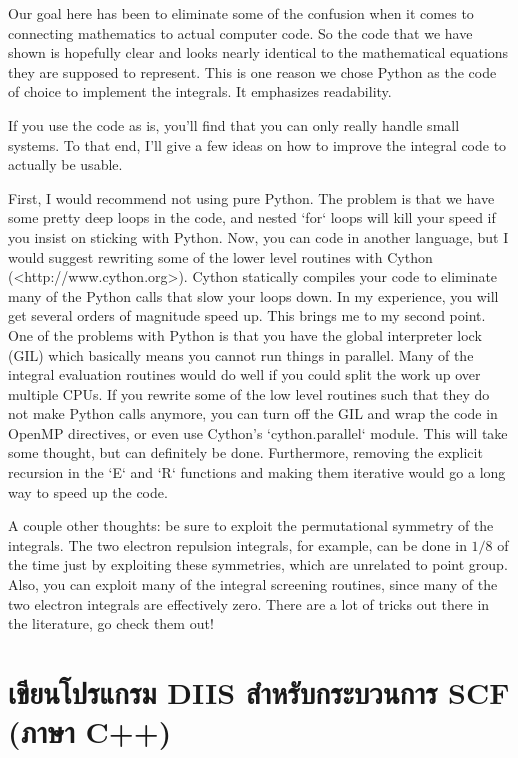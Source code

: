 Our goal here has been to eliminate some of the confusion when it comes
to connecting mathematics to actual computer code. So the code that we
have shown is hopefully clear and looks nearly identical to the
mathematical equations they are supposed to represent. This is one
reason we chose Python as the code of choice to implement the
integrals. It emphasizes readability.

If you use the code as is, you'll find that you can only really handle
small systems. To that end, I'll give a few ideas on how to improve the
integral code to actually be usable.

First, I would recommend not using pure Python. The problem is that we
have some pretty deep loops in the code, and nested `for` loops will
kill your speed if you insist on sticking with Python. Now, you can
code in another language, but I would suggest rewriting some of the
lower level routines with Cython (<http://www.cython.org>). Cython
statically compiles your code to eliminate many of the Python calls
that slow your loops down. In my experience, you will get several orders
of magnitude speed up. This brings me to my second point. One of the
problems with Python is that you have the global interpreter lock
(GIL) which basically means you cannot run things in parallel. Many of
the integral evaluation routines would do well if you could split the
work up over multiple CPUs. If you rewrite some of the low level
routines such that they do not make Python calls anymore, you can turn
off the GIL and wrap the code in OpenMP directives, or even use Cython's `cython.parallel` module. This will take some thought, but
can definitely be done. Furthermore, removing the explicit recursion in the
`E` and `R` functions and making them iterative would go a long way to speed
up the code.

A couple other thoughts: be sure to exploit the permutational symmetry
of the integrals. The two electron repulsion integrals, for example, can
be done in $1/8$ of the time just by exploiting these symmetries, which
are unrelated to point group. Also, you can exploit many of the integral
screening routines, since many of the two electron integrals are
effectively zero. There are a lot of tricks out there in the literature,
go check them out!

\section{เขียนโปรแกรม DIIS สำหรับกระบวนการ SCF (ภาษา C++)}

